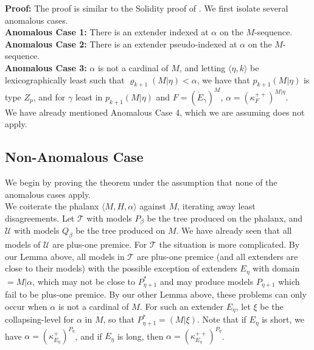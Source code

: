 \documentclass[12pt]{article}
\begin{document}
\indent \indent \textbf{Proof:} The proof is similar to the Solidity proof of \cite{FSPIPM}.  We first isolate several anomalous cases.\\

\textbf{Anomalous Case 1:} There is an extender indexed at $\alpha$ on the $M$-sequence.\\

\textbf{Anomalous Case 2:} There is an extender pseudo-indexed at $\alpha$ on the $M$-sequence.\\

\textbf{Anomalous Case 3:} $\alpha$ is not a cardinal of $M$, and letting $\langle \eta, k \rangle$ be lexicographically least such that $\varrho_{k+1} (M | \eta ) < \alpha$, we have that $p_{k + 1} (M | \eta)$ is type $Z_p$, and for $\gamma$ least in $p_{k+1} (M | \eta)$ and $F = ( \dot{E}_\gamma )^M$, $\alpha = (\kappa_F^{++} )^{M | \eta }$.\\

We have already mentioned Anomalous Case 4, which we are assuming does not apply.\\


\subsection{Non-Anomalous Case}

We begin by proving the theorem under the assumption that none of the anomalous cases apply.\\

We coiterate the phalanx $\langle M, H, \alpha \rangle$ against $M$, iterating away least disagreements.  Let $\mathscr{T}$ with models $P_\beta$ be the tree produced on the phalanx, and $\mathscr{U}$ with models $Q_\beta$ be the tree produced on $M$.  We have already seen that all models of $\mathscr{U}$ are plus-one premice.  For $\mathscr{T}$ the situation is more complicated.  By our Lemma above, all models in $\mathscr{T}$ are plus-one premice (and all extenders are close to their models) with the possible exception of extenders $E_\eta$ with domain $= M | \alpha$, which may not be close to $P_{\eta + 1}^*$ and may produce models $P_{\eta + 1}$ which fail to be plus-one premice.  By our other Lemma above, these problems can only occur when $\alpha$ is not a cardinal of $M$.  For such an extender $E_\eta$, let $\xi$ be the collapsing-level for $\alpha$ in $M$, so that $P_{\eta + 1}^* = ( M | \xi )$.  Note that if $E_\eta$ is short, we have $\alpha = ( \kappa_{E_\eta}^+ )^{P_\eta}$, and if $E_\eta$ is long, then $\alpha = ( \kappa_{E_\eta}^{++} )^{P_\eta}$. \\
\end{document}
